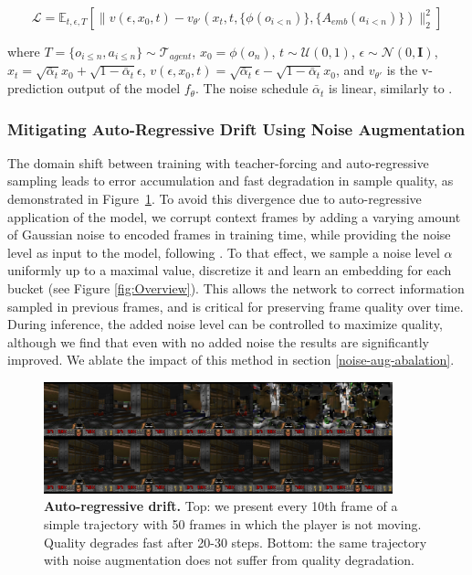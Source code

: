 \documentclass{article} %
\begin{document}
\begin{equation}
    \mathcal{L} = \mathbb{E}_{t,\epsilon,T} \left[ \| v(\epsilon, x_0, t) - v_{\theta'}(x_t, t, \{\phi(o_{i < n})\}, \{A_{emb}(a_{i < n})\}) \|_2^2 \right]
\end{equation}

where $T = \{{o_{i \leq n}, a_{i \leq n}}\} \sim \mathcal{T}_{agent}$, $x_0 = \phi(o_n)$, $t \sim \mathcal{U}(0, 1)$, $\epsilon \sim \mathcal{N}(0, \mathbf{I})$, $x_t = \sqrt{\bar{\alpha}_t} x_0 + \sqrt{1 - \bar{\alpha}_t} \epsilon$,
$v(\epsilon, x_0, t) = \sqrt{\bar{\alpha}_t} \epsilon - \sqrt{1 - \bar{\alpha}_t} x_0$,
and $v_{\theta'}$ is the v-prediction output of the model $f_{\theta}$. The noise schedule $\bar{\alpha}_t$ is linear, similarly to \cite{rombach2022high}.

\subsubsection{Mitigating Auto-Regressive Drift Using Noise Augmentation}
\label{sec:mitigating ar noise}

The domain shift between training with teacher-forcing and auto-regressive sampling leads to error accumulation and fast degradation in sample quality, as demonstrated in Figure~\ref{fig:noise_aug}. To avoid this divergence due to auto-regressive application of the model, we corrupt context frames by adding a varying amount of Gaussian noise to encoded frames in training time, while providing the noise level as input to the model, following \cite{ho2021cascaded}. To that effect, we sample a noise level $\alpha$ uniformly up to a maximal value, discretize it and learn an embedding for each bucket (see Figure \ref{fig:Overview}). This allows the network to correct information sampled in previous frames, and is critical for preserving frame quality over time. During inference, the added noise level can be controlled to maximize quality, although we find that even with no added noise the results are significantly improved. We ablate the impact of this method in section \ref{noise-aug-abalation}.

\begin{figure}[t]
    \centering
    \includegraphics[width=0.9\textwidth]{figures/noise_aug_ablation_new.png}
    \caption{\textbf{Auto-regressive drift.} Top: we present every 10th frame of a simple trajectory with 50 frames in which the player is not moving. Quality degrades fast after 20-30 steps. Bottom: the same trajectory with noise augmentation does not suffer from quality degradation.}
    \label{fig:noise_aug}
\end{figure}
\end{document}

